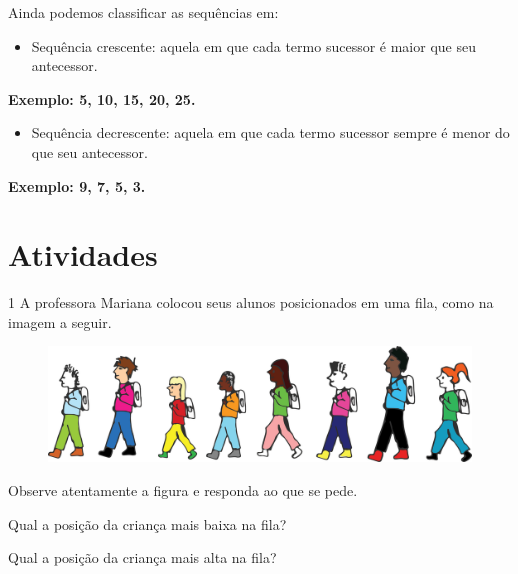 {Ainda podemos classificar as sequências em:

\begin{itemize}
\item
  Sequência crescente: aquela em que cada termo sucessor é maior que seu antecessor.
\end{itemize}

\begin{myquote}
\centering
\textbf{Exemplo: 5, 10, 15, 20, 25.}
\end{myquote}

\begin{itemize}
\item
  Sequência decrescente: aquela em que cada termo sucessor sempre é menor do que seu antecessor.
\end{itemize}

\begin{myquote}
\centering
\textbf{Exemplo: 9, 7, 5, 3.}
\end{myquote}
}

\section*{Atividades}

\num{1} A professora Mariana colocou seus alunos posicionados em uma fila, 
como na imagem a seguir.

\begin{figure}[htpb!]
\centering
\includegraphics[width=\textwidth]{./media/image27.png}
\end{figure}

Observe atentamente a figura e responda ao que se pede.

\begin{escolha}
\item Qual a posição da criança mais baixa na fila? 

\item Qual a posição da criança mais alta na fila? 
\end{escolha}

